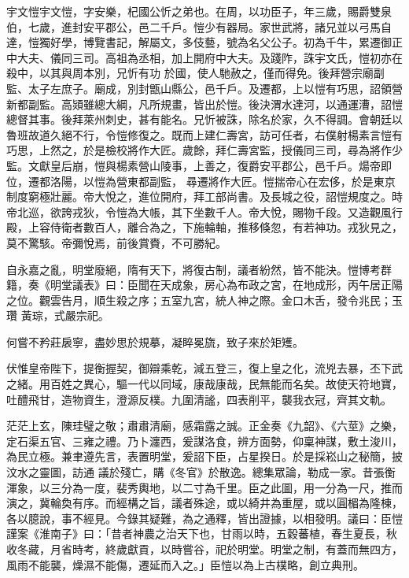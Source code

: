 
\begin{pinyinscope}

 宇文愷宇文愷，字安樂，杞國公忻之弟也。在周，以功臣子，年三歲，賜爵雙泉伯，七歲，進封安平郡公，邑二千戶。愷少有器局。家世武將，諸兄並以弓馬自達，愷獨好學，博覽書記，解屬文，多伎藝，號為名父公子。初為千牛，累遷御正中大夫、儀同三司。高祖為丞相，加上開府中大夫。及踐阼，誅宇文氏，愷初亦在殺中，以其與周本別，兄忻有功
 於國，使人馳赦之，僅而得免。後拜營宗廟副監、太子左庶子。廟成，別封甑山縣公，邑千戶。及遷都，上以愷有巧思，詔領營新都副監。高熲雖總大綱，凡所規畫，皆出於愷。後決渭水達河，以通運漕，詔愷總督其事。後拜萊州刺史，甚有能名。兄忻被誅，除名於家，久不得調。會朝廷以魯班故道久絕不行，令愷修復之。既而上建仁壽宮，訪可任者，右僕射楊素言愷有巧思，上然之，於是檢校將作大匠。歲餘，拜仁壽宮監，授儀同三司，尋為將作少監。文獻皇后崩，愷與楊素營山陵事，上善之，復爵安平郡公，邑千戶。煬帝即位，遷都洛陽，以愷為營東都副監，
 尋遷將作大匠。愷揣帝心在宏侈，於是東京制度窮極壯麗。帝大悅之，進位開府，拜工部尚書。及長城之役，詔愷規度之。時帝北巡，欲誇戎狄，令愷為大帳，其下坐數千人。帝大悅，賜物千段。又造觀風行殿，上容侍衛者數百人，離合為之，下施輪軸，推移倏忽，有若神功。戎狄見之，莫不驚駭。帝彌悅焉，前後賞賚，不可勝紀。



 自永嘉之亂，明堂廢絕，隋有天下，將復古制，議者紛然，皆不能決。愷博考群籍，奏《明堂議表》曰：臣聞在天成象，房心為布政之宮，在地成形，丙午居正陽之位。觀雲告月，順生殺之序；五室九宮，統人神之際。金口木舌，發令兆民；玉瓚
 黃琮，式嚴宗祀。



 何嘗不矜莊扆寧，盡妙思於規摹，凝睟冕旒，致子來於矩矱。



 伏惟皇帝陛下，提衡握契，御辯乘乾，減五登三，復上皇之化，流兇去暴，丕下武之緒。用百姓之異心，驅一代以同域，康哉康哉，民無能而名矣。故使天符地寶，吐醴飛甘，造物資生，澄源反樸。九圍清謐，四表削平，襲我衣冠，齊其文軌。



 茫茫上玄，陳珪璧之敬；肅肅清廟，感霜露之誠。正金奏《九韶》、《六莖》之樂，定石渠五官、三雍之禮。乃卜瀍西，爰謀洛食，辨方面勢，仰稟神謀，敷土浚川，為民立極。兼聿遵先言，表置明堂，爰詔下臣，占星揆日。於是採崧山之秘簡，披汶水之靈圖，訪通
 議於殘亡，購《冬官》於散逸。總集眾論，勒成一家。昔張衡渾象，以三分為一度，裴秀輿地，以二寸為千里。臣之此圖，用一分為一尺，推而演之，冀輪奐有序。而經構之旨，議者殊途，或以綺井為重屋，或以圓楣為隆棟，各以臆說，事不經見。今錄其疑難，為之通釋，皆出證據，以相發明。議曰：臣愷謹案《淮南子》曰：「昔者神農之治天下也，甘雨以時，五穀蕃植，春生夏長，秋收冬藏，月省時考，終歲獻貢，以時嘗谷，祀於明堂。明堂之制，有蓋而無四方，風雨不能襲，燥濕不能傷，遷延而入之。」臣愷以為上古樸略，創立典刑。




\end{pinyinscope}
